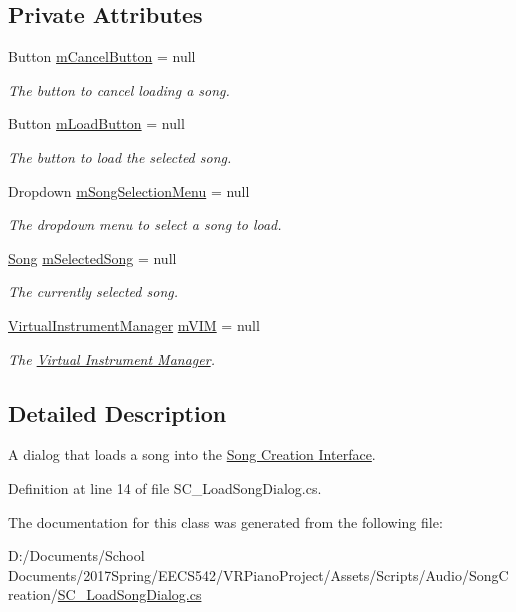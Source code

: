 \subsection*{Private Attributes}
\begin{DoxyCompactItemize}
\item 
Button \hyperlink{group___s_c___l_s_d_priv_var_ga31e17d7ca1cb32f0ad75ef8c7235873f}{m\+Cancel\+Button} = null
\begin{DoxyCompactList}\small\item\em The button to cancel loading a song. \end{DoxyCompactList}\item 
Button \hyperlink{group___s_c___l_s_d_priv_var_gaa27cfb6231ef826024dd063828efa364}{m\+Load\+Button} = null
\begin{DoxyCompactList}\small\item\em The button to load the selected song. \end{DoxyCompactList}\item 
Dropdown \hyperlink{group___s_c___l_s_d_priv_var_ga93543d4b5bf0c2127cb5489112cc29be}{m\+Song\+Selection\+Menu} = null
\begin{DoxyCompactList}\small\item\em The dropdown menu to select a song to load. \end{DoxyCompactList}\item 
\hyperlink{class_song}{Song} \hyperlink{group___s_c___l_s_d_priv_var_ga007db4c9493497f21fb518ab676226a4}{m\+Selected\+Song} = null
\begin{DoxyCompactList}\small\item\em The currently selected song. \end{DoxyCompactList}\item 
\hyperlink{class_virtual_instrument_manager}{Virtual\+Instrument\+Manager} \hyperlink{group___s_c___l_s_d_priv_var_ga6ffbaa999c431dd52e57c242b1b33b49}{m\+V\+IM} = null
\begin{DoxyCompactList}\small\item\em The \hyperlink{group___v_i_m}{Virtual Instrument Manager}. \end{DoxyCompactList}\end{DoxyCompactItemize}


\subsection{Detailed Description}
A dialog that loads a song into the \hyperlink{group___doc_s_c}{Song Creation Interface}. 

Definition at line 14 of file S\+C\+\_\+\+Load\+Song\+Dialog.\+cs.



The documentation for this class was generated from the following file\+:\begin{DoxyCompactItemize}
\item 
D\+:/\+Documents/\+School Documents/2017\+Spring/\+E\+E\+C\+S542/\+V\+R\+Piano\+Project/\+Assets/\+Scripts/\+Audio/\+Song\+Creation/\hyperlink{_s_c___load_song_dialog_8cs}{S\+C\+\_\+\+Load\+Song\+Dialog.\+cs}\end{DoxyCompactItemize}
